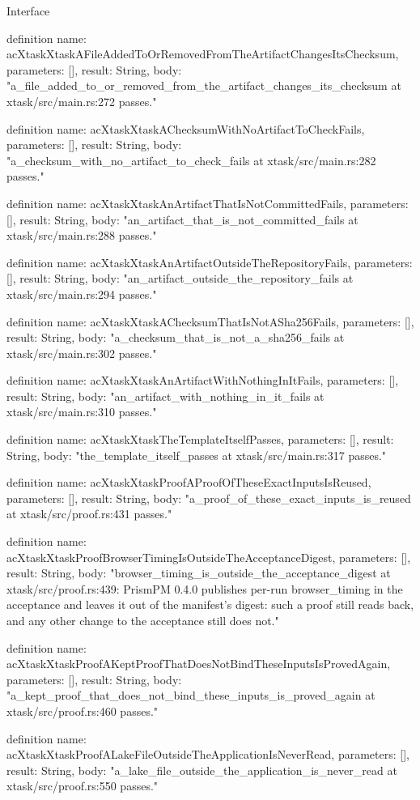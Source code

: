 \begin{lexlean}{Interface}
\begin{semanticmodule}
definition{
  name: acXtaskXtaskAFileAddedToOrRemovedFromTheArtifactChangesItsChecksum,
  parameters: [],
  result: String,
  body: "a_file_added_to_or_removed_from_the_artifact_changes_its_checksum at xtask/src/main.rs:272 passes."
}

definition{
  name: acXtaskXtaskAChecksumWithNoArtifactToCheckFails,
  parameters: [],
  result: String,
  body: "a_checksum_with_no_artifact_to_check_fails at xtask/src/main.rs:282 passes."
}

definition{
  name: acXtaskXtaskAnArtifactThatIsNotCommittedFails,
  parameters: [],
  result: String,
  body: "an_artifact_that_is_not_committed_fails at xtask/src/main.rs:288 passes."
}

definition{
  name: acXtaskXtaskAnArtifactOutsideTheRepositoryFails,
  parameters: [],
  result: String,
  body: "an_artifact_outside_the_repository_fails at xtask/src/main.rs:294 passes."
}

definition{
  name: acXtaskXtaskAChecksumThatIsNotASha256Fails,
  parameters: [],
  result: String,
  body: "a_checksum_that_is_not_a_sha256_fails at xtask/src/main.rs:302 passes."
}

definition{
  name: acXtaskXtaskAnArtifactWithNothingInItFails,
  parameters: [],
  result: String,
  body: "an_artifact_with_nothing_in_it_fails at xtask/src/main.rs:310 passes."
}

definition{
  name: acXtaskXtaskTheTemplateItselfPasses,
  parameters: [],
  result: String,
  body: "the_template_itself_passes at xtask/src/main.rs:317 passes."
}

definition{
  name: acXtaskXtaskProofAProofOfTheseExactInputsIsReused,
  parameters: [],
  result: String,
  body: "a_proof_of_these_exact_inputs_is_reused at xtask/src/proof.rs:431 passes."
}

definition{
  name: acXtaskXtaskProofBrowserTimingIsOutsideTheAcceptanceDigest,
  parameters: [],
  result: String,
  body: "browser_timing_is_outside_the_acceptance_digest at xtask/src/proof.rs:439: PrismPM 0.4.0 publishes per-run browser_timing in the acceptance and leaves it out of the manifest's digest: such a proof still reads back, and any other change to the acceptance still does not."
}

definition{
  name: acXtaskXtaskProofAKeptProofThatDoesNotBindTheseInputsIsProvedAgain,
  parameters: [],
  result: String,
  body: "a_kept_proof_that_does_not_bind_these_inputs_is_proved_again at xtask/src/proof.rs:460 passes."
}

definition{
  name: acXtaskXtaskProofALakeFileOutsideTheApplicationIsNeverRead,
  parameters: [],
  result: String,
  body: "a_lake_file_outside_the_application_is_never_read at xtask/src/proof.rs:550 passes."
}


\end{semanticmodule}
\end{lexlean}
